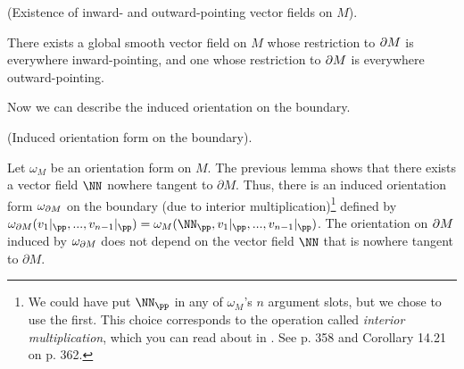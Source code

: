 
\begin{lemma}
     (Existence of inward- and outward-pointing vector fields on $M$).
    
    There exists a global smooth vector field on $M$ whose restriction to $\partial M$ is everywhere inward-pointing, and one whose restriction to $\partial M$ is everywhere outward-pointing.
\end{lemma}

Now we can describe the induced orientation on the boundary.

\begin{theorem}
\label{ch::manifolds::induced_orientation_form_on_bdy}
     (Induced orientation form on the boundary).

    Let $\omega_M$ be an orientation form on $M$. The previous lemma shows that there exists a vector field $\NN$ nowhere tangent to $\partial M$. Thus, there is an induced orientation form $\omega_{\partial M}$ on the boundary (due to interior multiplication)\footnote{We could have put $\NN_\pp$ in any of $\omega_M$'s $n$ argument slots, but we chose to use the first. This choice corresponds to the operation called \textit{interior multiplication}, which you can read about in \cite{book::SM}. See p. 358 and Corollary 14.21 on p. 362.} defined by $\omega_{\pd M}(v_1|_\pp, ..., v_{n - 1}|_\pp) = \omega_M(\NN_\pp, v_1|_\pp, ..., v_{n - 1}|_\pp)$. The orientation on $\partial M$ induced by $\omega_{\partial M}$ does not depend on the vector field $\NN$ that is nowhere tangent to $\partial M$. 
\end{theorem}

